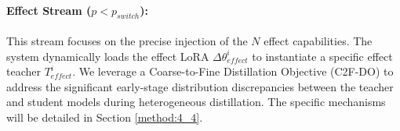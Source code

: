 \paragraph{Effect Stream ($p < p_{switch}$):}
This stream focuses on the precise injection of the $N$ effect capabilities. The system dynamically loads the effect LoRA $\Delta\theta_{effect}^{i}$ to instantiate a specific effect teacher $T_{effect}^{i}$. 
We leverage a Coarse-to-Fine Distillation Objective (C2F-DO) to address the significant early-stage distribution discrepancies between the teacher and student models during heterogeneous distillation. The specific mechanisms will be detailed in Section \ref{method:4_4}.



